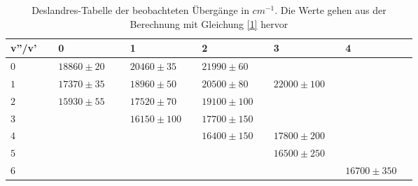 \begin{table}[H]
 
\caption{Deslandres-Tabelle der beobachteten Übergänge in $\si{cm}^{-1}$. Die
Werte gehen aus der Berechnung mit Gleichung \ref{1} hervor}
\begin{tabular}{L{0.1\linewidth}|L{0.15\linewidth}L{0.15\linewidth}L{0.15\linewidth}L{0.15\linewidth}L{0.15\linewidth}}

 
v''/v' & 0 & 1 & 2 & 3 & 4 \\
\hline \addlinespace[1ex]
$0$ & $18860 \pm 20$ & $20460 \pm 35$ & $21990 \pm60$ &  &  \\
$1$ & $17370 \pm 35$ & $18960 \pm 50$ & $20500\pm 80$ & $22000\pm 100$ &  \\
$2$ & $15930 \pm 55$ & $17520 \pm 70$ & $19100 \pm 100$ &  & \\
$3$ &  & $16150\pm100$ & $17700\pm 150$ &  & \\
$4$ &  &  & $16400\pm150$ & $17800\pm200$ & \\
$5$ &  &  &  & $16500\pm 250$ & \\ 
$6$ &  &  &  & & $16700\pm 350$\\  
 \end{tabular}
 \label{tab2}
 \end{table}





%